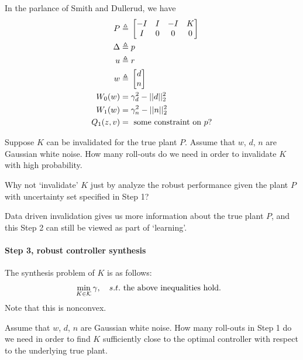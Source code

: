 \documentclass[11pt, onecolumn]{article}
\newcommand{\qq}[1]{{\color{magenta}{(#1)}}}
\begin{document}
In the parlance of Smith and Dullerud, we have
\begin{align*}
P \triangleq &\; \begin{bmatrix}-I & I & -I & K\\I & 0 & 0 & 0\end{bmatrix}\\
\Delta \triangleq &\; p \\
u \triangleq &\; r \\
w \triangleq &\; \begin{bmatrix}d\\n\end{bmatrix}\\
W_0(w) = &\; \gamma_d^2 - ||d||_2^2\\
W_1(w) = &\; \gamma_n^2 - ||n||_2^2\\
Q_1(z,v) = &\; \text{ some constraint on $p$?}
\end{align*}


  Suppose $K$ can be invalidated for the true plant $P$. Assume
that $w$, $d$, $n$ are Gaussian white noise. How many roll-outs \qq{in Step 1 and Step 2 }do we need
in order to invalidate $K$ with high probability.

 Why not `invalidate' $K$ just by analyze the robust performance given the plant $P$ with
uncertainty set specified in Step 1?

Data driven invalidation gives us more information about the true plant $P$,
and this Step 2 can still be viewed as part of `learning'.


\paragraph{Step 3, robust controller synthesis}
The synthesis problem of $K$ is as follows:
\begin{align*}
  &\min_{K\in\mathcal K} \gamma,\quad s.t. \text{ the above inequalities hold}.
\end{align*}
Note that this is  nonconvex.

Assume that $w$, $d$, $n$ are Gaussian white noise. How many roll-outs in Step 1 do we need in order
to find $K$ sufficiently close to the optimal controller with respect to the underlying true plant.



\end{document}
